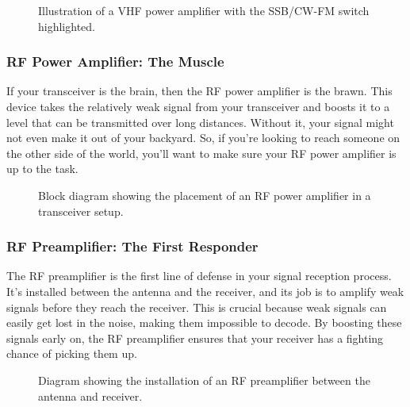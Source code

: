 \begin{figure}[h!]
    \centering
    \caption{Illustration of a VHF power amplifier with the SSB/CW-FM switch highlighted.}
    \label{fig:vhf-amp-switch}
\end{figure}

\subsubsection*{RF Power Amplifier: The Muscle}
If your transceiver is the brain, then the RF power amplifier is the brawn. This device takes the relatively weak signal from your transceiver and boosts it to a level that can be transmitted over long distances. Without it, your signal might not even make it out of your backyard. So, if you're looking to reach someone on the other side of the world, you'll want to make sure your RF power amplifier is up to the task.

\begin{figure}[h!]
    \centering
    \caption{Block diagram showing the placement of an RF power amplifier in a transceiver setup.}
    \label{fig:rf-power-amp-diagram}
\end{figure}

\subsubsection*{RF Preamplifier: The First Responder}
The RF preamplifier is the first line of defense in your signal reception process. It's installed between the antenna and the receiver, and its job is to amplify weak signals before they reach the receiver. This is crucial because weak signals can easily get lost in the noise, making them impossible to decode. By boosting these signals early on, the RF preamplifier ensures that your receiver has a fighting chance of picking them up.

\begin{figure}[h!]
    \centering
    \caption{Diagram showing the installation of an RF preamplifier between the antenna and receiver.}
    \label{fig:rf-preamplifier-installation}
\end{figure}

